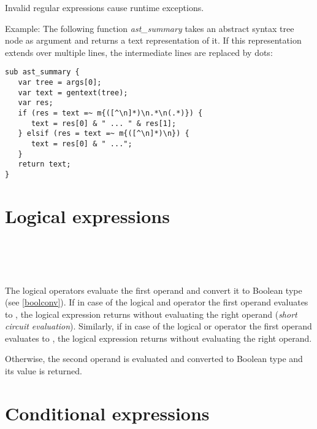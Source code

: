 Invalid regular expressions cause runtime exceptions.

Example: The following function \textit{ast\_summary} takes
an abstract syntax tree node as argument and returns a
text representation of it. If this representation extends over
multiple lines, the intermediate lines are replaced by dots:

\begin{lstlisting}
sub ast_summary {
   var tree = args[0];
   var text = gentext(tree);
   var res;
   if (res = text =~ m{([^\n]*)\n.*\n(.*)}) {
      text = res[0] & " ... " & res[1];
   } elsif (res = text =~ m{([^\n]*)\n}) {
      text = res[0] & " ...";
   }
   return text;
}
\end{lstlisting}

\section{Logical expressions}

\begin{grammar}
      \produces {} \\
      \produces {}
         \lextoken{\&\&}  \\
      \produces {} \\
      \produces {}
         \lextoken{\barSY\barSY} 
\end{grammar}

\noindent
The logical operators evaluate the first operand and convert
it to Boolean type (see \ref{boolconv}). If in case of the
logical and operator \token{\&\&} the first operand evaluates
to , the logical expression returns 
without evaluating the right operand (\textit{short circuit
evaluation}). Similarly, if
in case of the logical or operator \token{\barSY\barSY} the
first operand evaluates to , the logical expression
returns  without evaluating the right operand.

Otherwise, the second operand is evaluated and converted to
Boolean type and its value is returned.

\section{Conditional expressions}


